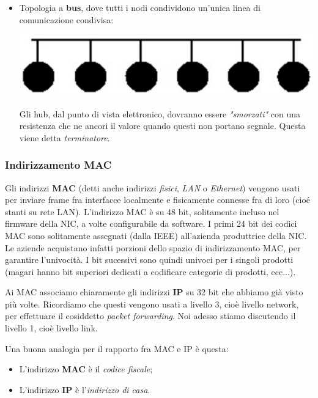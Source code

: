 \documentclass[a4paper,11pt]{article}
\begin{document}
\begin{itemize}
\begin{center}
		\end{center}
	\item Topologia a \textbf{bus}, dove tutti i nodi condividono un'unica linea di comunicazione condivisa:
		\begin{center}
			\includegraphics[scale=0.11]{../figures/bus.png}
		\end{center}
		Gli hub, dal punto di vista elettronico, dovranno essere \textit{"smorzati"} con una resistenza che ne ancori il valore quando questi non portano segnale. Questa viene detta \textit{terminatore}.
\end{itemize}

\subsubsection{Indirizzamento MAC}
Gli indirizzi \textbf{MAC} (detti anche indirizzi \textit{fisici}, \textit{LAN} o \textit{Ethernet}) vengono usati per inviare frame fra interfacce localmente e fisicamente connesse fra di loro (cioé stanti su rete LAN).
L'indirizzo MAC è su 48 bit, solitamente incluso nel firmware della NIC, a volte configurabile da software.
I primi 24 bit dei codici MAC sono solitamente assegnati (dalla IEEE) all'azienda produttrice della NIC.
Le aziende acquistano infatti porzioni dello spazio di indirizzamento MAC, per garantire l'univocità. 
I bit sucessivi sono quindi univoci per i singoli prodotti (magari hanno bit superiori dedicati a codificare categorie di prodotti, ecc...).

Ai MAC associamo chiaramente gli indirizzi \textbf{IP} su 32 bit che abbiamo già visto più volte. Ricordiamo che questi vengono usati a livello 3, cioè livello network, per effettuare il cosiddetto \textit{packet forwarding}. Noi adesso stiamo discutendo il livello 1, cioè livello link.

Una buona analogia per il rapporto fra MAC e IP è questa:
\begin{itemize}
	\item L'indirizzo \textbf{MAC} è il \textit{codice fiscale};
	\item L'indirizzo \textbf{IP} è l'\textit{indirizzo di casa}.
\end{itemize}
\end{document}
